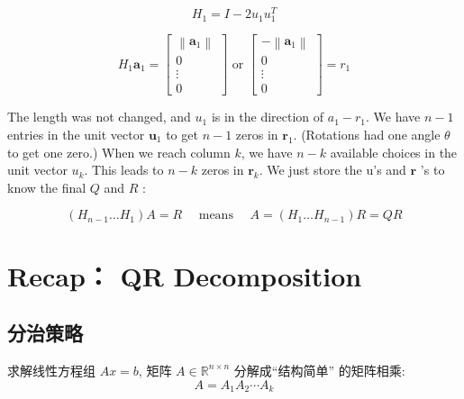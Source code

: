 \begin{example}[Reflection by $H_1$]
    \begin{equation}H_1 = I - 2 u_1 u_1^T\end{equation}

    \begin{equation}H_{1} \boldsymbol{a}_{1}=\left[\begin{array}{c}
        \left\|\boldsymbol{a}_{1}\right\| \\
        0 \\
        \vdots \\
        0
        \end{array}\right] \text { or }\left[\begin{array}{c}
        -\left\|\boldsymbol{a}_{1}\right\| \\
        0 \\
        \vdots \\
        0
        \end{array}\right]=r_{1}\end{equation}


The length was not changed, and $u_{1}$ is in the direction of $a_{1}-r_{1}$. We have $n-1$ entries in the unit vector $\boldsymbol{u}_{1}$ to get $n-1$ zeros in $\boldsymbol{r}_{1}$. (Rotations had one angle $\theta$ to get one zero.) When we reach column $k$, we have $n-k$ available choices in the unit vector $u_{k}$. This leads to $n-k$ zeros in $\boldsymbol{r}_{k}$. We just store the u's and $\boldsymbol{r}$ 's to know the final $Q$ and $R$ :

\begin{theorem}[$H$的逆是它本身]
    \begin{equation}
\left(H_{n-1} \ldots H_{1}\right) A=R \quad \text { means }  \quad A=\left(H_{1} \ldots H_{n-1}\right) R=Q R
\end{equation}
\end{theorem}

\end{example}


\section{Recap： QR Decomposition}

\subsection{分治策略}

求解线性方程组 $ A x=b $, 矩阵 $ A \in \mathbb{R}^{n \times n} $ 分解成“结构简单” 的矩阵相乘:
\begin{equation}
A=A_{1} A_{2} \cdots A_{k}
\end{equation}

